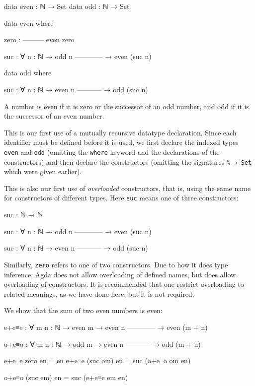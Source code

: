 \begin{fence}
\begin{code}
data even : ℕ → Set
data odd  : ℕ → Set

data even where

  zero :
      ---------
      even zero

  suc  : ∀ {n : ℕ}
    → odd n
      ------------
    → even (suc n)

data odd where

  suc  : ∀ {n : ℕ}
    → even n
      -----------
    → odd (suc n)
\end{code}
\end{fence}

A number is even if it is zero or the successor of an odd number, and
odd if it is the successor of an even number.

This is our first use of a mutually recursive datatype declaration.
Since each identifier must be defined before it is used, we first
declare the indexed types \texttt{even} and \texttt{odd} (omitting the
\texttt{where} keyword and the declarations of the constructors) and
then declare the constructors (omitting the signatures
\texttt{ℕ\ →\ Set} which were given earlier).

This is also our first use of \emph{overloaded} constructors, that is,
using the same name for constructors of different types. Here
\texttt{suc} means one of three constructors:

\begin{myDisplay}
suc : ℕ → ℕ

suc : ∀ {n : ℕ}
  → odd n
    ------------
  → even (suc n)

suc : ∀ {n : ℕ}
  → even n
    -----------
  → odd (suc n)
\end{myDisplay}

Similarly, \texttt{zero} refers to one of two constructors. Due to how
it does type inference, Agda does not allow overloading of defined
names, but does allow overloading of constructors. It is recommended
that one restrict overloading to related meanings, as we have done here,
but it is not required.

We show that the sum of two even numbers is even:

\begin{fence}
\begin{code}
e+e≡e : ∀ {m n : ℕ}
  → even m
  → even n
    ------------
  → even (m + n)

o+e≡o : ∀ {m n : ℕ}
  → odd m
  → even n
    -----------
  → odd (m + n)

e+e≡e zero     en  =  en
e+e≡e (suc om) en  =  suc (o+e≡o om en)

o+e≡o (suc em) en  =  suc (e+e≡e em en)
\end{code}
\end{fence}

